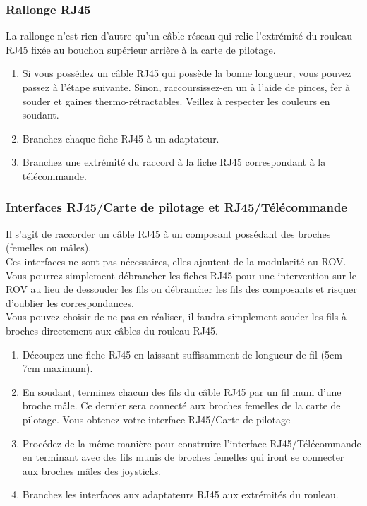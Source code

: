 \documentclass[11pt,a4paper]{article}
\begin{document}
      
        \subsubsection{Rallonge RJ45}
          La rallonge n'est rien d'autre qu'un câble réseau qui relie l'extrémité du rouleau RJ45 fixée au bouchon supérieur arrière à la carte de pilotage. 
          
          \begin{enumerate}
            \item Si vous possédez un câble RJ45 qui possède la bonne longueur, vous pouvez passez à l'étape suivante. Sinon, raccoursissez-en un à l'aide de pinces, fer à souder et gaines thermo-rétractables. Veillez à respecter les couleurs en soudant.
            \item Branchez chaque fiche RJ45 à un adaptateur.
            \item Branchez une extrémité du raccord à la fiche RJ45 correspondant à la télécommande.
          \end{enumerate}
          
        \subsubsection{Interfaces RJ45/Carte de pilotage et RJ45/Télécommande}
          Il s'agit de raccorder un câble RJ45 à un composant possédant des broches (femelles ou mâles). \\
          Ces interfaces ne sont pas nécessaires, elles ajoutent de la modularité au ROV. Vous pourrez simplement débrancher les fiches RJ45 pour une intervention sur le ROV au lieu de dessouder les fils ou débrancher les fils des composants et risquer d'oublier les correspondances.\\
          Vous pouvez choisir de ne pas en réaliser, il faudra simplement souder les fils à broches directement aux câbles du rouleau RJ45.
          
          \begin{enumerate}
            \item Découpez une fiche RJ45 en laissant suffisamment de longueur de fil (5cm -- 7cm maximum).
            
            \item En soudant, terminez chacun des fils du câble RJ45 par un fil muni d'une broche mâle. Ce dernier sera connecté aux broches femelles de la carte de pilotage. Vous obtenez votre interface RJ45/Carte de pilotage
            
            \item Procédez de la même manière pour construire l'interface RJ45/Télécommande en terminant avec des fils munis de broches femelles qui iront se connecter aux broches mâles des joysticks.
            
            \item Branchez les interfaces aux adaptateurs RJ45 aux extrémités du rouleau. 
            
          \end{enumerate}
\end{document}
